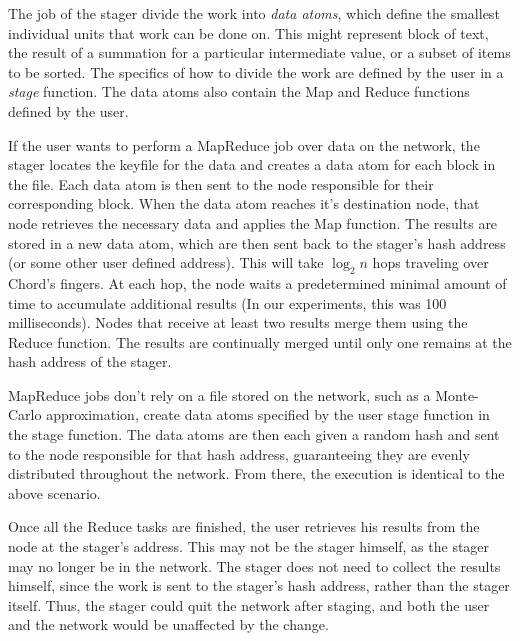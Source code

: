 \documentclass[10pt, conference, compsocconf]{IEEEtran}
\begin{document}
The job of the stager divide the work into \emph{data atoms}, which define the smallest individual units that work can be done on. This might represent block of text, the result of a summation for a particular intermediate value, or a subset of items to be sorted. The specifics of how to divide the work are defined by the user in a \emph{stage} function.  The data atoms also contain the Map and Reduce functions defined by the user.

If the user wants to perform a MapReduce job over data on the network, the stager locates the keyfile for the data and creates a data atom for each block in the file.  Each data atom is then sent to the node responsible for their corresponding block.  When the data atom reaches it's destination node, that node retrieves the necessary data and applies the Map function.  The results are stored in a new data atom,  which are then sent back to the stager's hash address (or some other user defined address).  This will take $\log_{2} n$ hops traveling over Chord's fingers.  At each hop, the node waits a predetermined minimal amount of time to accumulate additional results (In our experiments, this was 100 milliseconds).  Nodes that receive at least two results merge them using the Reduce function.  The results are continually merged until only one remains at the hash address of the stager. 


MapReduce jobs don't rely on a file stored on the network, such as a Monte-Carlo approximation, create data atoms specified by the user stage function in the stage function.  The data atoms are then each given a random hash and sent to the node responsible for that hash address, guaranteeing they are evenly distributed throughout the network. From there, the execution is identical to the above scenario.



Once all the Reduce tasks are finished, the user retrieves his results from the node at the stager's address.  This may not be the stager himself, as the stager may no longer be in the network.  The stager does not need to collect the results himself, since the work is sent to the stager's hash address, rather than the stager itself.  Thus, the stager could quit the network after staging, and both the user and the network would be unaffected by the change. %
\end{document}
